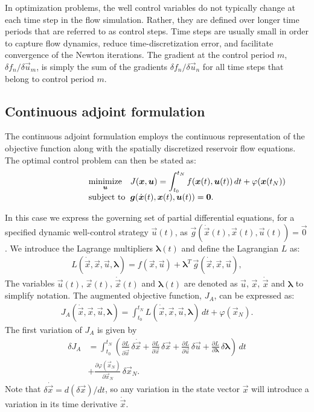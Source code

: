 \documentclass[twocolumn,numbook]{svjour3}          %
\makeatletter
\newcommand{\integral}[1]{\int_{t_0}^{t_N} {#1} \, dt}
\newcommand{\pder}[2]{\frac{\partial #1}{\partial #2}}
\def\u{{\vec u}}
\def\x{{\vec x}}
\def\p{{\vec{g}}}
\def\0{{\vec 0}}
\def\blambda{{\pmb{\lambda}}}%
\def\M{{\varphi}}
\def\F{f}
\def\myobj{J}
\def\minim{\mathop{\hbox{\rm minimize}}}
\def\minimize#1{{\displaystyle\minim_{#1}}}
\def\subject{\mbox{\rm subject to}}
\def\L{L}                    %
\def\problem#1#2#3#4{%
   {\begin{tabular*}{0.47\textwidth}
    {@{}l@{\extracolsep{\fill}}l@{\extracolsep{6pt}}l@{\extracolsep{\fill}}c@{}}
      #1 & $\minimize{#2}$ & $#3$ & $ $ \\[5pt]
         & $\subject$      & $#4$ & $ $
    \end{tabular*}}}
\makeatother
\begin{document}
In optimization problems, the well control variables do not typically change at each time step in the flow simulation. Rather, they are defined over longer time periods that are referred to as control steps. Time steps are usually small in order to capture flow dynamics, reduce time-discretization error, and facilitate convergence of the Newton iterations. 
The gradient at the control period $m$, $\delta f_n/\delta \u_m$, is simply the sum of
the gradients $\delta f_n/\delta \u_n$ for all time steps that belong to control period $m$.


\subsection{Continuous adjoint formulation}
\label{section:continuousAdjoint}
The continuous adjoint formulation employs the continuous
representation of the objective function along with the spatially discretized reservoir flow equations. The optimal control problem can then be stated as:
\[
   \problem{}{\u}{\displaystyle \myobj(\x, \u) = \integral{ \F(\x(t), \u(t)) } + \M(\x(t_N))}
                 {\p(\dot\x(t), \x(t), \u(t) ) = \0.}
\]


In this case we express the governing set of partial differential
equations, for a specified dynamic well-control strategy $\u(t)$, as $\p(\dot{\x}(t), \x(t), \u(t) ) = \0$.  
We introduce the Lagrange multipliers $\blambda(t)$  and define the Lagrangian $\L$ as:
%
\begin{align}
  \label{eq:lagrangian}
  \L(\dot{\x}, \x, \u, \blambda) = \F(\x, \u) + \blambda^T \, \p(\dot{\x}, \x, \u ),
\end{align}
%
The
variables $\u(t)$, $\x(t)$, $\dot{\x}(t)$ and $\blambda(t)$ are denoted
as $\u$, $\x$, $\dot{\x}$ and $\blambda$ to simplify notation. The
augmented objective function, $\myobj_A$, can be expressed as:
%
\begin{align}
  \myobj_A(\dot{\x}, \x, \u, \blambda) = \integral{\L(\dot{\x}, \x, \u, \blambda)} + \M(\x_N).
\end{align}
%
The first variation of $\myobj_A$ is given by
%
\begin{align}
\label{eq:firstvariation}
  \delta \myobj_A
  &= \integral{
    \left (
    \pder{\L}{\dot{\x}} \, \delta \dot{\x}
  + \pder{\L}{\x} \, \delta \x
  + \pder{\L}{\u} \, \delta \u
  + \pder{\L}{\blambda} \, \delta \blambda \right ) }
  \nonumber \\
  &+ \pder{\M(\x_N)}{\x_N} \, \delta \x_N.
\end{align}
%
Note that $\delta \dot{\x} = d (\delta \x) / d t$, so any variation in
the state vector $\x$ will introduce a
variation in its time derivative $\dot{\x}$.
\end{document}
